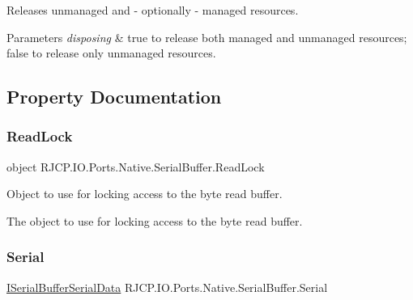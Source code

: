 Releases unmanaged and -\/ optionally -\/ managed resources. 


\begin{DoxyParams}{Parameters}
{\em disposing} & {\ttfamily true} to release both managed and unmanaged resources; {\ttfamily false} to release only unmanaged resources.\\
\hline
\end{DoxyParams}


\subsection{Property Documentation}
\mbox{\label{class_r_j_c_p_1_1_i_o_1_1_ports_1_1_native_1_1_serial_buffer_ad5684d554f4851a376ba471fb056450d}} 
\subsubsection{\texorpdfstring{ReadLock}{ReadLock}}
{\footnotesize\ttfamily object R\+J\+C\+P.\+I\+O.\+Ports.\+Native.\+Serial\+Buffer.\+Read\+Lock\hspace{0.3cm}{\ttfamily [get]}}



Object to use for locking access to the byte read buffer. 

The object to use for locking access to the byte read buffer. \mbox{\label{class_r_j_c_p_1_1_i_o_1_1_ports_1_1_native_1_1_serial_buffer_a37599d95e399d497f84c255e95040ee6}} 
\subsubsection{\texorpdfstring{Serial}{Serial}}
{\footnotesize\ttfamily \mbox{\hyperlink{interface_r_j_c_p_1_1_i_o_1_1_ports_1_1_native_1_1_i_serial_buffer_serial_data}{I\+Serial\+Buffer\+Serial\+Data}} R\+J\+C\+P.\+I\+O.\+Ports.\+Native.\+Serial\+Buffer.\+Serial\hspace{0.3cm}{\ttfamily [get]}}




